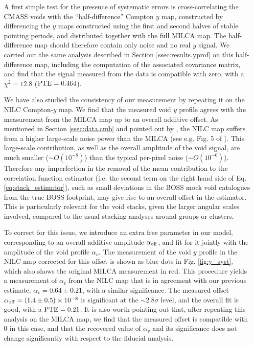 \documentclass[twocolumn,amsfont,amssymb,amsmath, showpacs,balancelastpage, nofootinbib]{revtex4-1}
\begin{document}
      A first simple test for the presence of systematic errors is cross-correlating the
      CMASS voids with the ``half-difference'' Compton $y$ map, constructed by differencing
      the $y$ maps constructed using the first and second halves of stable pointing periods,
      and distributed together with the full MILCA map. The half-difference map should
      therefore contain only noise and no real $y$ signal. We carried out the same analysis
      described in Section \ref{ssec:results.yprof} on this half-difference map, including
      the computation of the associated covariance matrix, and find that the signal measured
      from the data is compatible with zero, with a $\chi^2=12.8$ (${\rm PTE}=0.464$).
      
      We have also studied the consistency of our measurement by repeating it on the NILC
      Compton-$y$ map. We find that the measured void $y$ profile agrees with the
      measurement from the MILCA map up to an overall additive offset. As mentioned in
      Section \ref{ssec:data.cmb} and pointed out by \cite{2017MNRAS.467.2315V}, the NILC
      map suffers from a higher large-scale noise power than the MILCA (see e.g. Fig. 5 of
      \cite{2016A&A...594A..22P}). This large-scale contribution, as well as the overall
      amplitude of the void signal, are much smaller ($\sim O(10^{-8})$) than the typical
      per-pixel noise ($\sim O(10^{-6})$). Therefore any imperfection in the removal
      of the mean contribution to the correlation function estimator (i.e. the second term
      on the right hand side of Eq. \ref{eq:stack_estimator}), such as small deviations
      in the BOSS mock void catalogues from the true BOSS footprint, may give rise to an
      overall offset in the estimator. This is particularly relevant for the void stacks,
      given the larger angular scales involved, compared to the usual stacking analyses
      around groups or clusters.
            
      To correct for this issue, we introduce an extra free parameter in our model,
      corresponding to an overall additive amplitude $\alpha_{\rm off}$, and fit for it
      jointly with the amplitude of the void profile $\alpha_v$. The measurement of the
      void $y$ profile in the NILC map corrected for this offset is shown as blue dots
      in Fig. \ref{fig:y_syst}, which also shows the original MILCA measurement in red.
      This procedure yields a measurement of $\alpha_v$ from the NILC map that is in
      agreement with our previous estimate, $\alpha_v= 0.64\pm 0.21$, with a similar
      significance. The measured offset $\alpha_{\rm off}= (1.4\pm 0.5)\times10^{-8}$
      is significant at the $\sim2.8\sigma$ level, and the overall fit is good, with a 
      ${\rm PTE}=0.21$. It is also worth pointing out that, after repeating this analysis
      on the MILCA map, we find that the measured offset is compatible with $0$ in this
      case, and that the recovered value of $\alpha_v$ and its significance does not
      change significantly with respect to the fiducial analysis.
      
\end{document}
